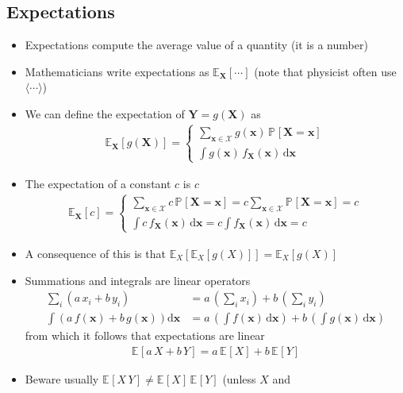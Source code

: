\documentclass[11pt]{article}
\newcommand{\av}[2][]{\mathbb{E}_{#1\!}\left[ #2 \right]}
\newcommand{\Prob}[2][]{\mathbb{P}_{#1\!}\left[ #2 \right]}
\newcommand{\bra}[1]{\left( #1 \right)}
\newcommand{\dd}{\mathrm{d}}
\begin{document}
\subsection{Expectations}
\label{sec:org2fecfd8}
\begin{itemize}
\item Expectations compute the average value of a quantity (it is a number)
\item Mathematicians write expectations as \(\av[\bm{X}]{\cdots}\) (note
that physicist often use \(\langle \cdots \rangle\))
\item We can define the expectation of \(\bm{Y}=g(\bm{X})\) as
\begin{align*}
  \av[\bm{X}]{g(\bm{X})} =
  \begin{cases}
    \displaystyle \sum_{\bm{x}\in\mathcal{X}} g(\bm{x})\, \Prob{\bm{X}=\bm{x}} \\
    \displaystyle \int g(\bm{x})\, f_{\bm{X}}(\bm{x}) \, \dd \bm{x}
  \end{cases}
\end{align*}
\item The expectation of a constant \(c\) is \(c\)
\begin{align*}
  \av[\bm{X}]{c} =
  \begin{cases}
    \displaystyle \sum_{\bm{x}\in\mathcal{X}} c\,
    \Prob{\bm{X}=\bm{x}}
    = c \sum_{\bm{x}\in\mathcal{X}}  \Prob{\bm{X}=\bm{x}}
    = c \\
    \displaystyle \int c\, f_{\bm{X}}(\bm{x}) \, \dd \bm{x}
    = c \int  f_{\bm{X}}(\bm{x}) \, \dd \bm{x} =c 
  \end{cases}
\end{align*}
\item A consequence of this is that \(\av[X]{\av[X]{g(X)}} =
    \av[X]{g(X)}\)
\item Summations and integrals are linear operators
\begin{align*}
  \sum_i \bra{a\,x_i + b\,y_i}
  &= a\,\bra{ \sum_i  x_i} +  b\,\bra{\sum_i y_i} \\
  \int \bra{a\,f(\bm{x}) + b\, g(\bm{x})} \dd \bm{x}
  &=a \, \bra{ \int f(\bm{x})\, \dd \bm{x}} + b \,  \bra{ \int g(\bm{x})\, \dd \bm{x}}
\end{align*}
from which it follows that expectations are linear
\begin{align*}
  \av{a\,X + b\,Y} = a\,\av{X} + b\, \av{Y}
\end{align*}
\item Beware usually \(\av{X\,Y}\neq \av{X}\,\av{Y}\) (unless \(X\) and

\end{itemize}
\end{document}
